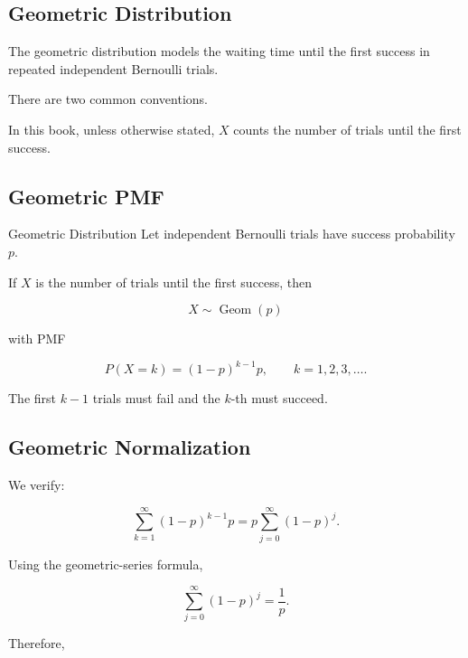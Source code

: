 \subsection{Geometric Distribution}
\label{subsec:geometric-distribution}

The geometric distribution models the waiting time until the first
success in repeated independent Bernoulli trials.

There are two common conventions.

In this book, unless otherwise stated, \(X\) counts the number of trials
until the first success.

\subsection{Geometric PMF}
\label{subsec:geometric-pmf}

\begin{definitionbox}{Geometric Distribution}
Let independent Bernoulli trials have success probability \(p\).

If \(X\) is the number of trials until the first success, then

\[
\boxed{
X\sim\operatorname{Geom}(p)
}
\]

with PMF

\[
\boxed{
P(X=k)
=
(1-p)^{k-1}p,
\qquad
k=1,2,3,\ldots.
}
\]
\end{definitionbox}

The first \(k-1\) trials must fail and the \(k\)-th must succeed.

\subsection{Geometric Normalization}
\label{subsec:geometric-normalization}

We verify:

\[
\sum_{k=1}^{\infty}
(1-p)^{k-1}p
=
p
\sum_{j=0}^{\infty}(1-p)^j.
\]

Using the geometric-series formula,

\[
\sum_{j=0}^{\infty}(1-p)^j
=
\frac1p.
\]

Therefore,

